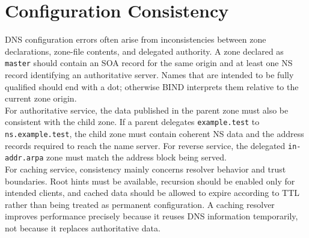 \documentclass{scrbook}
\begin{document}
	\section{Configuration Consistency}
	
	DNS configuration errors often arise from inconsistencies between zone declarations, zone-file contents, and delegated authority. A zone declared as \texttt{master} should contain an SOA record for the same origin and at least one NS record identifying an authoritative server. Names that are intended to be fully qualified should end with a dot; otherwise BIND interprets them relative to the current zone origin.\\
	
	For authoritative service, the data published in the parent zone must also be consistent with the child zone. If a parent delegates \texttt{example.test} to \texttt{ns.example.test}, the child zone must contain coherent NS data and the address records required to reach the name server. For reverse service, the delegated \texttt{in-addr.arpa} zone must match the address block being served.\\
	
	For caching service, consistency mainly concerns resolver behavior and trust boundaries. Root hints must be available, recursion should be enabled only for intended clients, and cached data should be allowed to expire according to TTL rather than being treated as permanent configuration. A caching resolver improves performance precisely because it reuses DNS information temporarily, not because it replaces authoritative data.
\end{document}
